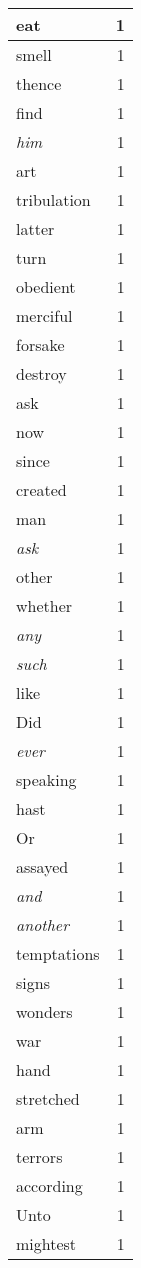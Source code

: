 \begin{center}
\begin{longtable}{l|r}
eat & 1 \\ \hline
smell & 1 \\ \hline
thence & 1 \\ \hline
find & 1 \\ \hline
\emph{him} & 1 \\ \hline
art & 1 \\ \hline
tribulation & 1 \\ \hline
latter & 1 \\ \hline
turn & 1 \\ \hline
obedient & 1 \\ \hline
merciful & 1 \\ \hline
forsake & 1 \\ \hline
destroy & 1 \\ \hline
ask & 1 \\ \hline
now & 1 \\ \hline
since & 1 \\ \hline
created & 1 \\ \hline
man & 1 \\ \hline
\emph{ask} & 1 \\ \hline
other & 1 \\ \hline
whether & 1 \\ \hline
\emph{any} & 1 \\ \hline
\emph{such} & 1 \\ \hline
like & 1 \\ \hline
Did & 1 \\ \hline
\emph{ever} & 1 \\ \hline
speaking & 1 \\ \hline
hast & 1 \\ \hline
Or & 1 \\ \hline
assayed & 1 \\ \hline
\emph{and} & 1 \\ \hline
\emph{another} & 1 \\ \hline
temptations & 1 \\ \hline
signs & 1 \\ \hline
wonders & 1 \\ \hline
war & 1 \\ \hline
hand & 1 \\ \hline
stretched & 1 \\ \hline
arm & 1 \\ \hline
terrors & 1 \\ \hline
according & 1 \\ \hline
Unto & 1 \\ \hline
mightest & 1 \\ \hline

\end{longtable}
\end{center}
